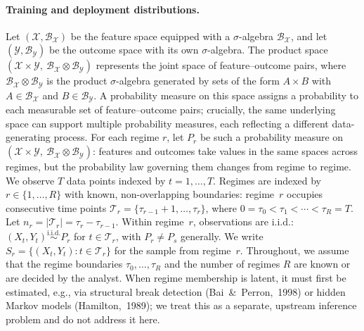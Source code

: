 \documentclass[11pt]{article}
\begin{document}
\paragraph{Training and deployment distributions.}
Let $(\mathcal X,\mathcal B_{\mathcal X})$ be the feature space equipped with a $\sigma$-algebra
$\mathcal B_{\mathcal X}$,
and let $(\mathcal Y,\mathcal B_{\mathcal Y})$ be the outcome space with its own $\sigma$-algebra.
The product space $(\mathcal X\times\mathcal Y,\ \mathcal B_{\mathcal X}\otimes\mathcal B_{\mathcal Y})$
represents the joint space of feature--outcome pairs, where
$\mathcal B_{\mathcal X}\otimes\mathcal B_{\mathcal Y}$ is the product $\sigma$-algebra generated by
sets of the form $A\times B$ with $A\in\mathcal B_{\mathcal X}$ and $B\in\mathcal B_{\mathcal Y}$.
A probability measure on this space assigns a probability to each measurable set of
feature--outcome pairs; crucially, the same underlying space can support multiple probability
measures, each reflecting a different data-generating process.
For each regime $r$, let $P_r$ be such a probability measure on
$(\mathcal X\times\mathcal Y,\ \mathcal B_{\mathcal X}\otimes\mathcal B_{\mathcal Y})$:
features and outcomes take values in the same spaces across regimes, but the
probability law governing them changes from regime to regime.
We observe $T$ data points indexed by $t=1,\dots,T$.
Regimes are indexed by $r\in\{1,\dots,R\}$ with known, non-overlapping boundaries:
regime~$r$ occupies consecutive time points
$\mathcal T_r = \{\tau_{r-1}+1,\dots,\tau_r\}$,
where $0=\tau_0 < \tau_1 < \cdots < \tau_R = T$.
Let $n_r = |\mathcal T_r| = \tau_r - \tau_{r-1}$.
Within regime~$r$, observations are i.i.d.:
$(X_t,Y_t) \stackrel{\text{i.i.d.}}{\sim} P_r$ for $t\in\mathcal T_r$,
with $P_r \neq P_s$ generally.
We write $S_r = \{(X_t,Y_t) : t\in\mathcal T_r\}$ for the sample from regime~$r$.
Throughout, we assume that the regime boundaries $\tau_0,\dots,\tau_R$ and the number of
regimes $R$ are known or are decided by the analyst. When regime membership is latent, it must first be
estimated, e.g., via structural break detection \mbox{(Bai \& Perron, 1998)} or hidden Markov
models \mbox{(Hamilton, 1989)}; we treat this as a separate, upstream inference problem and
do not address it here.
\end{document}
